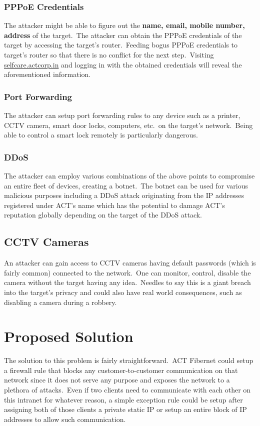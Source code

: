 \documentclass[11pt]{article}
\begin{document}
    \subsubsection{PPPoE Credentials}
    The attacker might be able to figure out the \textbf{name, email, mobile number, address} of the target.\ The
    attacker can obtain the PPPoE credentials of the target by accessing the target's router.\ Feeding bogus PPPoE
    credentials to target's router so that there is no conflict for the next step.\ Visiting
    \href{https://selfcare.actcorp.in}{selfcare.actcorp.in} and logging in with the obtained credentials will reveal
    the aforementioned information.

    \subsubsection{Port Forwarding}
    The attacker can setup port forwarding rules to any device such as a printer, CCTV camera, smart door locks,
    computers, etc.\ on the target's network.\ Being able to control a smart lock remotely is particularly dangerous.

    \subsubsection{DDoS}
    The attacker can employ various combinations of the above points to compromise an entire fleet of devices,
    creating a botnet.\ The botnet can be used for various malicious purposes including a DDoS attack originating
    from the IP addresses registered under ACT's name which has the potential to damage ACT's reputation globally
    depending on the target of the DDoS attack.

    \subsection{CCTV Cameras}\label{subsec:cctv-cameras}
    An attacker can gain access to CCTV cameras having default passwords (which is fairly common) connected to the
    network.\ One can monitor, control, disable the camera without the target having any idea.\ Needles to say this
    is a giant breach into the target's privacy and could also have real world consequences, such as disabling a camera
    during a robbery.


    \section{Proposed Solution}\label{sec:proposed-solution}
    The solution to this problem is fairly straightforward.\ ACT Fibernet could setup a firewall rule that blocks any
    customer-to-customer communication on that network since it does not serve any purpose and exposes the network to a
    plethora of attacks.\ Even if two clients need to communicate with each other on this intranet for whatever
    reason, a simple exception rule could be setup after assigning both of those clients a private static IP or setup
    an entire block of IP addresses to allow such communication.
\end{document}
